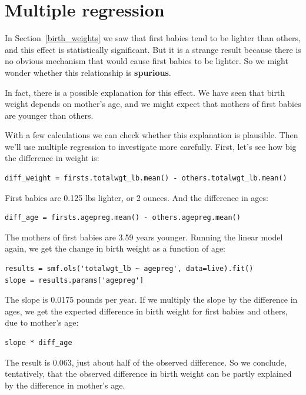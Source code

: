 \documentclass[12pt]{book}
\begin{document}
\section{Multiple regression}
\label{multiple}

In Section~\ref{birth_weights} we saw that first babies tend to be
lighter than others, and this effect is statistically significant.
But it is a strange result because there is no obvious mechanism that
would cause first babies to be lighter.  So we might wonder whether
this relationship is {\bf spurious}.

In fact, there is a possible explanation for this effect.  We have
seen that birth weight depends on mother's age, and we might expect
that mothers of first babies are younger than others.

With a few calculations we can check whether this explanation
is plausible.  Then we'll use multiple regression to investigate
more carefully.  First, let's see how big the difference in weight
is:

\begin{verbatim}
diff_weight = firsts.totalwgt_lb.mean() - others.totalwgt_lb.mean()
\end{verbatim}

First babies are 0.125 lbs lighter, or 2 ounces.  And the difference
in ages:

\begin{verbatim}
diff_age = firsts.agepreg.mean() - others.agepreg.mean()
\end{verbatim}

The mothers of first babies are 3.59 years younger.  Running the
linear model again, we get the change in birth weight as a function
of age:

\begin{verbatim}
results = smf.ols('totalwgt_lb ~ agepreg', data=live).fit()
slope = results.params['agepreg']
\end{verbatim}

The slope is 0.0175 pounds per year.  If we multiply the slope by
the difference in ages, we get the expected difference in birth
weight for first babies and others, due to mother's age:

\begin{verbatim}
slope * diff_age
\end{verbatim}

The result is 0.063, just about half of the observed difference.
So we conclude, tentatively, that the observed difference in birth
weight can be partly explained by the difference in mother's age. 
\end{document}

